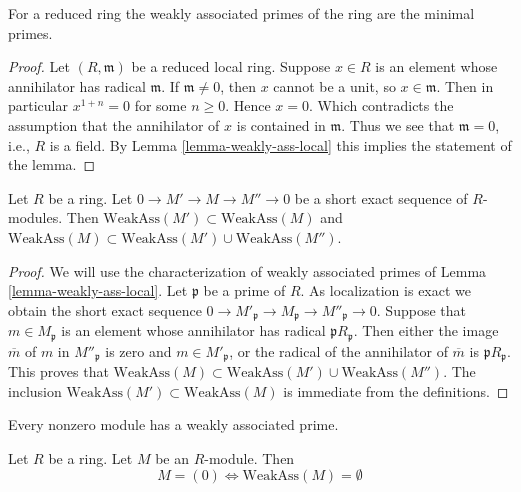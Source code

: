 \begin{lemma}
\label{lemma-reduced-weakly-ass-minimal}
For a reduced ring the weakly associated primes of the ring are
the minimal primes.
\end{lemma}

\begin{proof}
Let $(R, \mathfrak m)$ be a reduced local ring.
Suppose $x \in R$ is an element whose annihilator
has radical $\mathfrak m$. If $\mathfrak m \not = 0$, then $x$
cannot be a unit, so $x \in \mathfrak m$. Then in particular $x^{1 + n} = 0$
for some $n \geq 0$. Hence $x = 0$. Which contradicts the assumption
that the annihilator of $x$ is contained in $\mathfrak m$.
Thus we see that $\mathfrak m = 0$, i.e., $R$ is a field.
By Lemma \ref{lemma-weakly-ass-local} this
implies the statement of the lemma.
\end{proof}

\begin{lemma}
\label{lemma-weakly-ass}
Let $R$ be a ring.
Let $0 \to M' \to M \to M'' \to 0$ be a short exact sequence
of $R$-modules.
Then $\text{WeakAss}(M') \subset \text{WeakAss}(M)$ and
$\text{WeakAss}(M) \subset \text{WeakAss}(M') \cup \text{WeakAss}(M'')$.
\end{lemma}

\begin{proof}
We will use the characterization of weakly associated primes of
Lemma \ref{lemma-weakly-ass-local}.
Let $\mathfrak p$ be a prime of $R$. As localization is exact we obtain
the short exact sequence
$0 \to M'_{\mathfrak p} \to M_{\mathfrak p} \to M''_{\mathfrak p} \to 0$.
Suppose that $m \in M_{\mathfrak p}$ is an element whose annihilator
has radical $\mathfrak pR_{\mathfrak p}$. Then either the image $\overline{m}$
of $m$ in $M''_{\mathfrak p}$ is zero and $m \in M'_{\mathfrak p}$, or the
radical of the annihilator of $\overline{m}$ is $\mathfrak pR_{\mathfrak p}$.
This proves that
$\text{WeakAss}(M) \subset \text{WeakAss}(M') \cup \text{WeakAss}(M'')$.
The inclusion $\text{WeakAss}(M') \subset \text{WeakAss}(M)$ is immediate
from the definitions.
\end{proof}

\begin{lemma}
\label{lemma-weakly-ass-zero}
\begin{slogan}
Every nonzero module has a weakly associated prime.
\end{slogan}
Let $R$ be a ring. Let $M$ be an $R$-module. Then
$$
M = (0) \Leftrightarrow \text{WeakAss}(M) = \emptyset
$$
\end{lemma}

